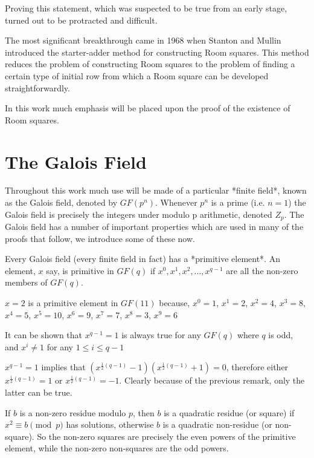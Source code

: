 \documentclass[
  11pt,
  a4paper]{book}\usepackage[]{graphicx}\usepackage[]{xcolor}
\newcounter{example}
\begin{document}
Proving this statement, which was suspected to be true from an early stage, turned out to be protracted and difficult.

The most significant breakthrough came in 1968 when Stanton and Mullin introduced the starter-adder method for constructing Room squares.
This method reduces the problem of constructing Room squares to the problem of finding a certain type of initial row from which a Room square can be developed straightforwardly.

In this work much emphasis will be placed upon the proof of the existence of Room squares.

\section{The Galois Field}

Throughout this work much use will be made of a particular *finite field*, known as the Galois field, denoted by $GF(p^n)$.
Whenever $p^n$ is a prime (i.e. $n=1$) the Galois field is precisely the integers under modulo p arithmetic, denoted $Z_p$.
The Galois field has a number of important properties which are used in many of the proofs that follow, we introduce some of these now.

Every Galois field (every finite field in fact) has a *primitive element*.
An element, $x$ say, is primitive in $GF(q)$ if $x^0,x^1,x^2,...,x^{q-1}$ are all the non-zero members of $GF(q)$.

\begin{example}
$x = 2$ is a primitive element in $GF(11)$ because, $x^0 = 1$, $x^1 = 2$, $x^2 = 4$, $x^3 = 8$, $x^4 = 5$, $x^5 = 10$, $x^6 = 9$, $x^7 = 7$, $x^8 = 3$, $x^9 = 6$
\end{example}

It can be shown \cite{boseResolvableSeriesBalanced1947} that $x^{q-1}=1$ is always true for any $GF(q)$ where $q$ is odd, and $x^i \neq 1$ for any $1 \leq i \leq q-1$

$x^{q-1}=1$ implies that $(x^{\frac{1}{2}(q - 1)} - 1)(x^{\frac{1}{2}(q - 1)} + 1) = 0$, therefore either $x^{\frac{1}{2}(q - 1)} = 1$ or $x^{\frac{1}{2}(q - 1)} = -1$.
Clearly because of the previous remark, only the latter can be true.

If $b$ is a non-zero residue modulo $p$, then $b$ is a quadratic residue (or square) if $x^2 \equiv b \pmod p$ has solutions, otherwise $b$ is a quadratic non-residue (or non-square).
So the non-zero squares are precisely the even powers of the primitive element, while the non-zero non-squares are the odd powers.
\end{document}

